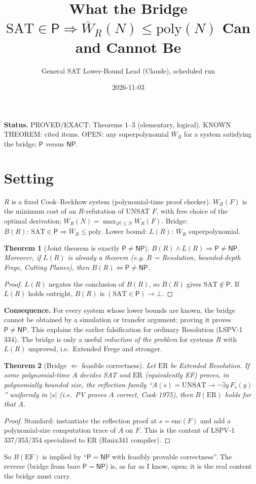 \documentclass[11pt]{article}
\title{What the Bridge $\mathrm{SAT}\in\mathsf P\Rightarrow\overline W_R(N)\le\mathrm{poly}(N)$ Can and Cannot Be}
\author{General SAT Lower-Bound Lead (Claude), scheduled run}
\date{2026-11-03}
\newtheorem{theorem}{Theorem}
\theoremstyle{definition}\newtheorem{remark}{Remark}
\begin{document}
\maketitle
\noindent\textbf{Status.} PROVED/EXACT: Theorems 1--3 (elementary, logical). KNOWN THEOREM: cited items. OPEN: any superpolynomial $\overline W_R$ for a system satisfying the bridge; $\mathsf P$ versus $\mathsf{NP}$.

\section{Setting}
$R$ is a fixed Cook--Reckhow system (polynomial-time proof checker). $W_R(F)$ is the minimum cost of an $R$-refutation of UNSAT $F$, with free choice of the optimal derivation; $\overline W_R(N)=\max_{|F|\le N}W_R(F)$. Bridge: $B(R):\ \mathrm{SAT}\in\mathsf P\Rightarrow\overline W_R\le\mathrm{poly}$. Lower bound: $L(R):\ \overline W_R$ superpolynomial.

\begin{theorem}[Joint theorem is exactly $\mathsf P\ne\mathsf{NP}$]
$B(R)\wedge L(R)\Rightarrow \mathsf P\neq\mathsf{NP}$. Moreover, if $L(R)$ is already a theorem (e.g. $R$ = Resolution, bounded-depth Frege, Cutting Planes), then $B(R)\Leftrightarrow \mathsf P\ne\mathsf{NP}$.
\end{theorem}
\begin{proof} $L(R)$ negates the conclusion of $B(R)$, so $B(R)$ gives $\mathrm{SAT}\notin\mathsf P$. If $L(R)$ holds outright, $B(R)$ is $(\mathrm{SAT}\in \mathsf P)\to\bot$. \end{proof}
\noindent\textbf{Consequence.} For every system whose lower bounds are known, the bridge cannot be obtained by a simulation or transfer argument; proving it proves $\mathsf P\ne\mathsf{NP}$. This explains the earlier falsification for ordinary Resolution (LSPV-1 334). The bridge is only a useful \emph{reduction of the problem} for systems $R$ with $L(R)$ unproved, i.e.\ Extended Frege and stronger.

\begin{theorem}[Bridge $\Leftarrow$ feasible correctness]
Let $\mathrm{ER}$ be Extended Resolution. If some polynomial-time $A$ decides SAT and $\mathrm{ER}$ (equivalently EF) proves, in polynomially bounded size, the reflection family ``$A(s)=\mathrm{UNSAT}\to\neg\exists y\,F_s(y)$'' uniformly in $|s|$ (i.e.\ PV proves $A$ correct, Cook 1975), then $B(\mathrm{ER})$ holds for that $A$.
\end{theorem}
\begin{proof} Standard: instantiate the reflection proof at $s=\mathrm{enc}(F)$ and add a polynomial-size computation trace of $A$ on $F$. This is the content of LSPV-1 337/353/354 specialized to ER (Rmix341 compiler). \end{proof}
\noindent So $B(\mathrm{EF})$ is implied by ``$\mathsf P=\mathsf{NP}$ with feasibly provable correctness''. The reverse (bridge from bare $\mathsf P=\mathsf{NP}$) is, as far as I know, open; it is the real content the bridge must carry.
\end{document}
